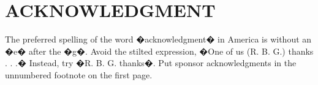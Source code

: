 \documentclass[letterpaper, 10 pt, conference]{ieeeconf}  %
\begin{document}






\section*{ACKNOWLEDGMENT}

The preferred spelling of the word �acknowledgment� in America is without an �e� after the �g�. Avoid the stilted expression, �One of us (R. B. G.) thanks . . .�  Instead, try �R. B. G. thanks�. Put sponsor acknowledgments in the unnumbered footnote on the first page.





\end{document}

